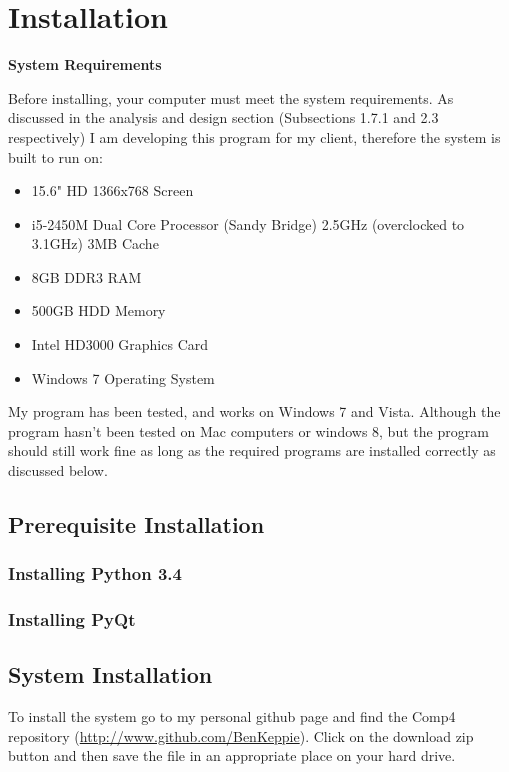 \section{Installation}

\textbf{System Requirements}

Before installing, your computer must meet the system requirements. As discussed in the analysis and design section (Subsections 1.7.1  and 2.3 respectively) I am developing this program for my client, therefore the system is built to run on:

\begin{itemize}
    \item 15.6" HD 1366x768 Screen
    \item i5-2450M Dual Core Processor (Sandy Bridge) 2.5GHz (overclocked to 3.1GHz) 3MB Cache
    \item 8GB DDR3 RAM
    \item 500GB HDD Memory
    \item Intel HD3000 Graphics Card
    \item Windows 7 Operating System
\end{itemize}

My program has been tested, and works on Windows 7 and Vista. Although the program hasn't been tested on Mac computers or windows 8, but the program should still work fine as long as the required programs are installed correctly as discussed below.




\subsection{Prerequisite Installation}


\subsubsection{Installing Python 3.4}

\subsubsection{Installing PyQt}



\subsection{System Installation}

To install the system go to my personal github page and find the Comp4 repository (\url{http://www.github.com/BenKeppie}). Click on the download zip button and then save the file in an appropriate place on your hard drive.

